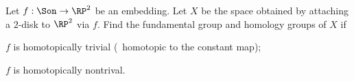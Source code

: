 Let $f:\Son\rightarrow \RP^2$ be an embedding. Let $X$ be the space
obtained by attaching a $2$-disk to $\RP^2$ via $f$. Find the
fundamental group and homology groups of $X$ if 
\begin{alist}
\item $f$ is homotopically trivial (\ie\ homotopic to the constant map);
\item $f$ is homotopically nontrival.
\end{alist}

